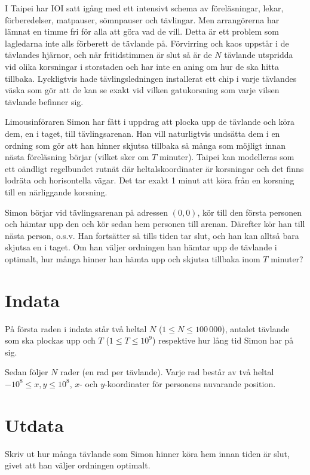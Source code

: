 I Taipei har IOI satt igång med ett intensivt schema av föreläsningar, lekar,
förberedelser, matpauser, sömnpauser och tävlingar. Men arrangörerna har lämnat
en timme fri för alla att göra vad de vill. Detta är ett problem som lagledarna
inte alls förberett de tävlande på. Förvirring och kaos uppstår i de tävlandes
hjärnor, och när fritidstimmen är slut så är de $N$ tävlande utspridda vid
olika korsningar i storstaden och har inte en aning om hur de ska hitta
tillbaka. Lyckligtvis hade tävlingsledningen installerat ett chip i varje
tävlandes väska som gör att de kan se exakt vid vilken gatukorsning som varje
vilsen tävlande befinner sig.

Limousinföraren Simon har fått i uppdrag att plocka upp de tävlande och köra
dem, en i taget, till tävlingsarenan. Han vill naturligtvis undsätta dem i en
ordning som gör att han hinner skjutsa tillbaka så många som möjligt innan
nästa föreläsning börjar (vilket sker om $T$ minuter). Taipei kan modelleras
som ett oändligt regelbundet rutnät där heltalskoordinater är korsningar och
det finns lodräta och horisontella vägar. Det tar exakt 1 minut att köra från
en korsning till en närliggande korsning.

Simon börjar vid tävlingsarenan på adressen $(0, 0)$, kör till den första
personen och hämtar upp den och kör sedan hem personen till arenan. Därefter
kör han till nästa person, o.s.v. Han fortsätter så tills tiden tar slut, och
han kan alltså bara skjutsa en i taget. Om han väljer ordningen han hämtar upp
de tävlande i optimalt, hur många hinner han hämta upp och skjutsa tillbaka
inom $T$ minuter?

\section*{Indata}
På första raden i indata står två heltal $N$ ($1 \leq N \leq 100\,000$), antalet tävlande som ska plockas upp och $T$ ($1 \leq T \leq 10^9$)
respektive hur lång tid Simon har på sig.

Sedan följer $N$ rader (en rad per tävlande). Varje rad består av
två heltal $-10^8 \leq x, y \leq 10^8$, $x$- och $y$-koordinater för personens
nuvarande position.

\section*{Utdata}
Skriv ut hur många tävlande som Simon hinner köra hem innan tiden är slut,
givet att han väljer ordningen optimalt.


